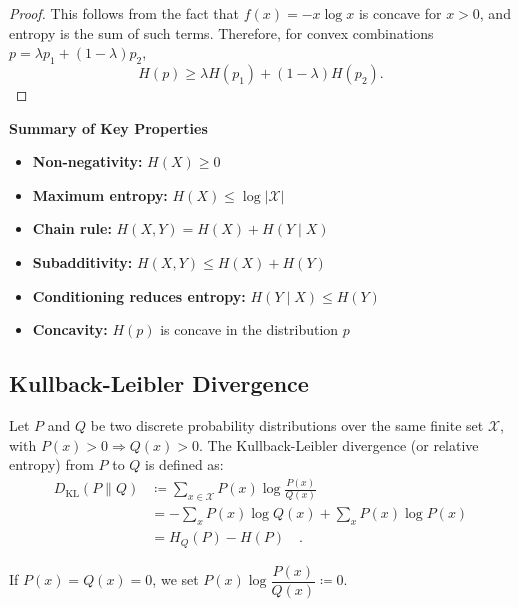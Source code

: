 \documentclass[../../main.tex]{subfiles}
\begin{document}
\begin{proof}
This follows from the fact that \( f(x) = -x \log x \) is concave for \( x > 0 \), and entropy is the sum of such terms. Therefore, for convex combinations \( p = \lambda p_1 + (1 - \lambda)p_2 \),
\[
H(p) \geq \lambda H(p_1) + (1 - \lambda) H(p_2).
\]
\end{proof}

\textbf{Summary of Key Properties}

\begin{itemize}[leftmargin=1.2cm]
    \item \textbf{Non-negativity:} \( H(X) \geq 0 \)
    \item \textbf{Maximum entropy:} \( H(X) \leq \log |\mathcal{X}| \)
    \item \textbf{Chain rule:} \( H(X, Y) = H(X) + H(Y \mid X) \)
    \item \textbf{Subadditivity:} \( H(X, Y) \leq H(X) + H(Y) \)
    \item \textbf{Conditioning reduces entropy:} \( H(Y \mid X) \leq H(Y) \)
    \item \textbf{Concavity:} \( H(p) \) is concave in the distribution \( p \)
\end{itemize}


\subsection{Kullback-Leibler Divergence}
\label{sec:kullback_leibler_divergence}

\begin{definition}[KL Divergence]
    Let \( P \) and \( Q \) be two discrete probability distributions over the same finite set \( \mathcal{X} \), with \( P(x) > 0 \Rightarrow Q(x) > 0 \). The Kullback-Leibler divergence (or relative entropy) from \( P \) to \( Q \) is defined as:
    \begin{align*}
        D_{\mathrm{KL}}(P \| Q) 
        &\coloneqq \sum_{x \in \mathcal{X}} P(x) \log \frac{P(x)}{Q(x)} \\
        &= - \sum_{x} P(x) \log Q(x) + \sum_{x} P(x) \log P(x) \\
        &= H_Q(P) - H(P) \quad .
    \end{align*}

\end{definition}

\begin{remark}
    If $P(x) = Q(x) = 0$, we set $P(x) \log \dfrac{P(x)}{Q(x)} \coloneqq 0$.
\end{remark}
\end{document}
